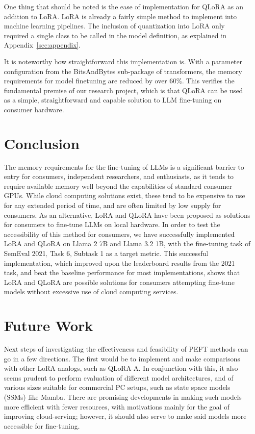 \documentclass[11pt]{article}
\begin{document}
One thing that should be noted is the ease of implementation for QLoRA as an addition to LoRA. LoRA is already a fairly simple method to implement into machine learning pipelines. The inclusion of quantization into LoRA only required a single class to be called in the model definition, as explained in Appendix~\ref{sec:appendix}.

It is noteworthy how straightforward this implementation is. With a parameter configuration from the BitsAndBytes sub-package of transformers, the memory requirements for model finetuning are reduced by over 60\%. This verifies the fundamental premise of our research project, which is that QLoRA can be used as a simple, straightforward and capable solution to LLM fine-tuning on consumer hardware.

\section{Conclusion}

The memory requirements for the fine-tuning of LLMs is a significant barrier to entry for consumers, independent researchers, and enthusiasts, as it tends to require available memory well beyond the capabilities of standard consumer GPUs. While cloud computing solutions exist, these tend to be expensive to use for any extended period of time, and are often limited by low supply for consumers. As an alternative, LoRA and QLoRA have been proposed as solutions for consumers to fine-tune LLMs on local hardware. In order to test the accessibility of this method for consumers, we have successfully implemented LoRA and QLoRA on Llama 2 7B and Llama 3.2 1B, with the fine-tuning task of SemEval 2021, Task 6, Subtask 1 as a target metric. This successful implementation, which improved upon the leaderboard results from the 2021 task, and beat the baseline performance for most implementations, shows that LoRA and QLoRA are possible solutions for consumers attempting fine-tune models without excessive use of cloud computing services.

\section{Future Work}
Next steps of investigating the effectiveness and feasibility of PEFT methods can go in a few directions. The first would be to implement and make comparisons with other LoRA analogs, such as QLoRA-A. In conjunction with this, it also seems prudent to perform evaluation of different model architectures, and of various sizes suitable for commercial PC setups, such as state space models (SSMs) like Mamba. There are promising developments in making such models more efficient with fewer resources, with motivations mainly for the goal of improving cloud-serving\cite{quamba}; however, it should also serve to make said models more accessible for fine-tuning.
\end{document}
